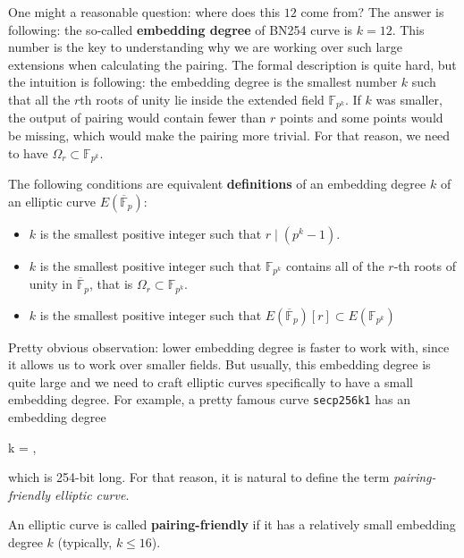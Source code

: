 \documentclass[../../book.tex]{subfiles}
\begin{document}
\begin{remark}
    One might a reasonable question: where does this $12$ come from? The answer is following: the so-called \textbf{embedding degree} of BN254 curve is $k=12$. This number is the key to understanding why we are working over such large extensions when calculating the pairing. The formal description is quite hard, but the intuition is following: the embedding degree is the smallest number $k$ such that all the $r$th roots of unity lie inside the extended field $\mathbb{F}_{p^k}$. If $k$ was smaller, the output of pairing would contain fewer than $r$ points and some points would be missing, which would make the pairing more trivial. For that reason, we need to have $\Omega_r \subset \mathbb{F}_{p^k}$.
\end{remark}

\begin{definition}
    The following conditions are equivalent \textbf{definitions} of an embedding degree $k$ of an elliptic curve $E(\overline{\mathbb{F}}_p)$:
    \begin{itemize}
        \item $k$ is the smallest positive integer such that $r \mid (p^k-1)$.
        \item $k$ is the smallest positive integer such that $\mathbb{F}_{p^k}$ contains all of the $r$-th roots of unity in $\overline{\mathbb{F}}_p$, that is $\Omega_r \subset \mathbb{F}_{p^k}$.
        \item $k$ is the smallest positive integer such that $E(\overline{\mathbb{F}}_p)[r] \subset E(\mathbb{F}_{p^k})$
    \end{itemize}
\end{definition}

Pretty obvious observation: lower embedding degree is faster to work with, since it allows us to work over smaller fields. But usually, this embedding degree is quite large and we need to craft elliptic curves specifically to have a small embedding degree. For example, a pretty famous curve \texttt{secp256k1} has an embedding degree
\begin{xequation*}
    k = ,
\end{xequation*}
which is 254-bit long. For that reason, it is natural to define the term \textit{pairing-friendly elliptic curve}.
\begin{definition}
    An elliptic curve is called \textbf{pairing-friendly} if it has a relatively small embedding degree $k$ (typically, $k \leq 16$).
\end{definition}
\end{document}
